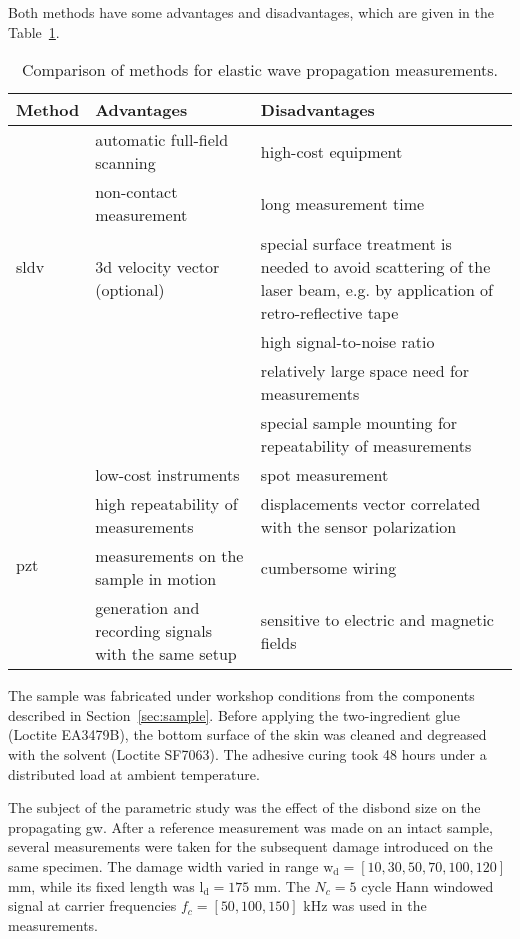 Both methods have some advantages and disadvantages, which are given in the Table~\ref{tab:method_comp}.
\begin{table}[H]
	\small
	\tabcolsep=0.2cm
	\caption{\label{tab:method_comp}Comparison of methods for elastic wave propagation measurements.}
	\begin{tabular}{p{}>{\raggedright}p{}>{\raggedright \arraybackslash}p{}}
		\toprule
		\textbf{Method} &\textbf{Advantages} & \textbf{Disadvantages}\\
		\midrule
		\multirow{5}{*}{\ac{sldv}}   & \tabitem automatic full-field scanning & \tabitem high-cost equipment\\ 
		& \tabitem non-contact measurement & \tabitem long measurement time\\
		& \tabitem \ac{3d} velocity vector (optional)& \tabitem special surface treatment is needed to avoid scattering of the laser beam, e.g. by application of retro-reflective tape\\
		& & \tabitem high signal-to-noise ratio\\
		& & \tabitem relatively large space need for measurements \\
		& & \tabitem special sample mounting for repeatability of measurements\\
		\midrule
		\multirow{5}{*}{\ac{pzt}} & \tabitem low-cost instruments & \tabitem spot measurement\\
		& \tabitem high repeatability of measurements & \tabitem displacements vector correlated with the sensor polarization\\
		& \tabitem measurements on the sample in motion & \tabitem cumbersome wiring\\
		& \tabitem generation and recording signals with the same setup & \tabitem sensitive to electric and magnetic fields\\		
		\bottomrule
	\end{tabular}
\end{table}

The sample was fabricated under workshop conditions from the components described in Section~\ref{sec:sample}.
Before applying the two-ingredient glue (Loctite EA3479B), the bottom surface of the skin was cleaned and degreased with the solvent (Loctite SF7063).
The adhesive curing took 48 hours under a distributed load at ambient temperature.

The subject of the parametric study was the effect of the disbond size on the propagating \ac{gw}.
After a reference measurement was made on an intact sample, several measurements were taken for the subsequent damage introduced on the same specimen.
The damage width varied in range \(\mathrm{w_d}=\left [10, 30, 50, 70, 100, 120 \right ]\) \unit{\mm}, while its fixed length was \(\mathrm{l_d} = 175\) \unit{\mm}.
%
%
The \(N_c=5\) cycle Hann windowed signal at carrier frequencies \(f_c=[50,100,150]\) \unit{\kHz} was used in the measurements.


